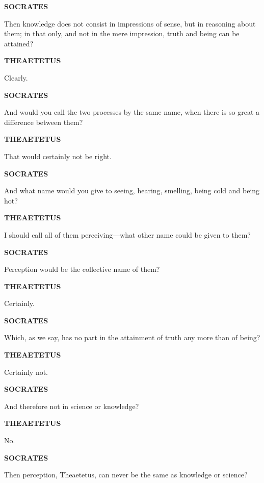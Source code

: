 \documentclass[11pt,letter]{article}
\begin{document}
\par \textbf{SOCRATES}
\par   Then knowledge does not consist in impressions of sense, but in reasoning about them; in that only, and not in the mere impression, truth and being can be attained?

\par \textbf{THEAETETUS}
\par   Clearly.

\par \textbf{SOCRATES}
\par   And would you call the two processes by the same name, when there is so great a difference between them?

\par \textbf{THEAETETUS}
\par   That would certainly not be right.

\par \textbf{SOCRATES}
\par   And what name would you give to seeing, hearing, smelling, being cold and being hot?

\par \textbf{THEAETETUS}
\par   I should call all of them perceiving—what other name could be given to them?

\par \textbf{SOCRATES}
\par   Perception would be the collective name of them?

\par \textbf{THEAETETUS}
\par   Certainly.

\par \textbf{SOCRATES}
\par   Which, as we say, has no part in the attainment of truth any more than of being?

\par \textbf{THEAETETUS}
\par   Certainly not.

\par \textbf{SOCRATES}
\par   And therefore not in science or knowledge?

\par \textbf{THEAETETUS}
\par   No.

\par \textbf{SOCRATES}
\par   Then perception, Theaetetus, can never be the same as knowledge or science?
\end{document}
